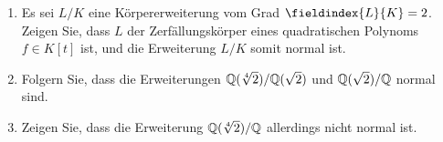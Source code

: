 \documentclass[a4paper, 10pt]{scrartcl}
\begin{document}
\begin{question}
  \begin{enumerate}
    \item
      Es sei $L/K$ eine Körpererweiterung vom Grad $\fieldindex{L}{K} = 2$.
      Zeigen Sie, dass $L$ der Zerfällungskörper eines quadratischen Polynoms $f \in K[t]$ ist, und die Erweiterung $L/K$ somit normal ist.
    \item
      Folgern Sie, dass die Erweiterungen $\mathbb{Q}(\sqrt[4]{2})/\mathbb{Q}(\sqrt{2})$ und $\mathbb{Q}(\sqrt{2})/\mathbb{Q}$ normal sind.
    \item
      Zeigen Sie, dass die Erweiterung $\mathbb{Q}(\sqrt[4]{2})/\mathbb{Q}$ allerdings nicht normal ist.
  \end{enumerate}
\end{question}
\end{document}
